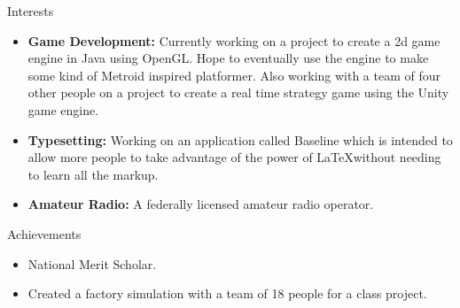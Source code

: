\documentclass[10pt,oneside]{article}
\newenvironment{ressection}[1]{
	\vspace{4pt}
	{\fontfamily{phv}\selectfont\Large#1}
	\begin{itemize}
	\vspace{3pt}
}{
	\end{itemize}
}
\newcommand{\resitem}[1]{
	\vspace{-4pt}
	\item \begin{flushleft} #1 \end{flushleft}
}
\begin{document}


\begin{ressection}{Interests}
	\resitem{\textbf{Game Development:}  Currently working on a project to create a 2d game engine in Java using OpenGL.  Hope to eventually use the engine to make some kind of Metroid inspired platformer.  Also working with a team of four other people on a project to create a real time strategy game using the Unity game engine.}
	\resitem{\textbf{Typesetting:} Working on an application called Baseline which is intended to allow more people to take advantage of the power of \LaTeX without needing to learn all the markup.} 
	\resitem{\textbf{Amateur Radio:}  A federally licensed amateur radio operator.}
\end{ressection}


\begin{ressection}{Achievements}


	\resitem{National Merit Scholar.}
	
	\resitem{Created a factory simulation with a team of 18 people for a class project.}
	

\end{ressection}
\end{document}
